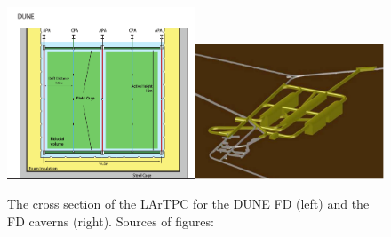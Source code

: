 \begin{figure}
\caption{The cross section of the LArTPC for the DUNE FD (left) and the FD caverns (right). Sources of figures: \cite{ref_LBNF_CDR}}
\label{fig:farDetector_TPC}
\centering
\includegraphics[width=0.5\textwidth, keepaspectratio=true]{figs/farDetector_TPC.png}\includegraphics[width=0.5\textwidth, keepaspectratio=true]{figs/farDetector_Caverns.png}
\end{figure}
